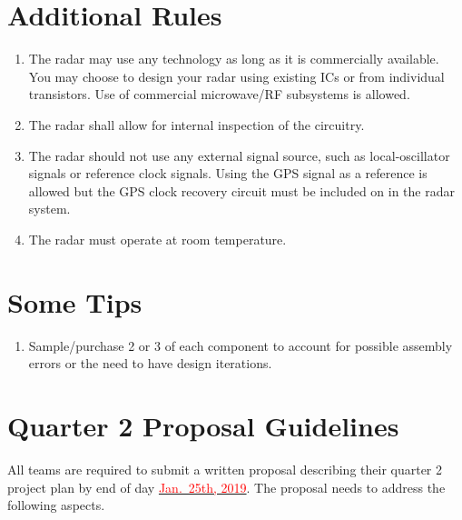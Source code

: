 \documentclass[letterpaper, 11pt]{article}
\newcommand{\due}[1]{\href{https://github.com/ucdart/UCD-EEC134/blob/master/support/schedule/eec134-schedule.pdf}{\textcolor{red}{#1}}}
\begin{document}
%	
%

\section{Additional Rules}
	\begin{enumerate}[itemsep=-0.1ex]
		
		\item The radar may use any technology as long as it is commercially available. You may choose to design your radar using existing ICs or from individual transistors. Use of commercial microwave/RF subsystems is allowed.
		
		\item The radar shall allow for internal inspection of the circuitry.
		
		\item The radar should not use any external signal source, such as local-oscillator signals or reference clock signals. Using the GPS signal as a reference is allowed but the GPS clock recovery circuit must be included on in the radar system.
		
		\item The radar must operate at room temperature. 		
	\end{enumerate}

\section{Some Tips}
\begin{enumerate}
	\item Sample/purchase 2 or 3 of each component to account for possible assembly errors or the need to have design iterations. 
\end{enumerate}

\section{Quarter 2 Proposal Guidelines}

All teams are required to submit a written proposal describing their quarter 2 project plan by end of day \due{Jan.~25th, 2019}. The proposal needs to address the following aspects.
\end{document}
